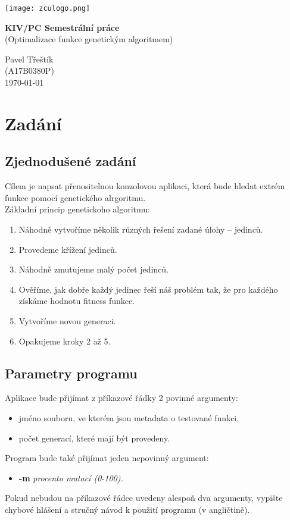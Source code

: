 \documentclass[11pt, a4paper]{article}
\begin{document}
%
%
\begin{titlepage}
\centerline{\texttt{[image: zculogo.png]}}
\vspace*{50px}
\begin{center}
{\LARGE\bf\noindent KIV/PC Semestrální práce}\\
(Optimalizace funkce genetickým algoritmem)
\vspace*{40px}

Pavel Třeštík \\
 (A17B0380P)\\
\vspace*{\fill}
\hspace*{\fill} \today \\
\end{center}
\end{titlepage}
\newpage
%
%
\tableofcontents
\newpage
%
%
%
%
%
%
%
\section{Zadání}
%
%
\subsection{Zjednodušené zadání}
Cílem je napsat přenositelnou konzolovou aplikaci, která bude hledat extrém funkce pomocí genetického alrgoritmu.\\
Základní princip genetickoho algoritmu:
\begin{enumerate}
  \item Náhodně vytvoříme několik různých řešení zadané úlohy -- jedinců.
  \item Provedeme křížení jedinců.
  \item Náhodně zmutujeme malý počet jedinců.
  \item Ověříme, jak dobře každý jedinec řeší náš problém tak, že pro každého získáme hodnotu fitness funkce.
  \item Vytvoříme novou generaci.
  \item Opakujeme kroky 2 až 5.
\end{enumerate}
\subsection{Parametry programu}
Aplikace bude přijímat z příkazové řádky 2 povinné argumenty:
\begin{itemize}
  \item jméno souboru, ve kterém jsou metadata o testované funkci,
  \item počet generací, které mají být provedeny.
\end{itemize}
Program bude také přijímat jeden nepovinný argument:
\begin{itemize}
  \item \textbf{-m} \it procento mutací (0-100).
\end{itemize}
Pokud nebudou na příkazové řádce uvedeny alespoň dva argumenty, vypište chybové hlášení a stručný návod k použití programu (v angličtině).
\end{document}
